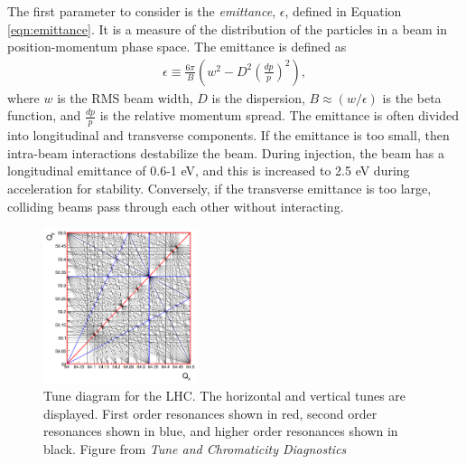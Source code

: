 The first parameter to consider is the \emph{emittance}, $\epsilon$, defined in Equation \ref{eqn:emittance}.
It is a measure of the distribution of the particles in a beam in position-momentum phase space.
The emittance is defined as
\begin{equation}\begin{split}\label{eqn:emittance}
\epsilon \equiv \frac{6\pi}{B}\left(w^2-D^2\left(\frac{dp}{p}\right)^2\right),
\end{split}\end{equation} 
where $w$ is the RMS beam width, $D$ is the dispersion, $B\approx(w/\epsilon)$ is the beta function, and $\frac{dp}{p}$ is the relative momentum spread.
The emittance is often divided into longitudinal and transverse components.
If the emittance is too small, then intra-beam interactions destabilize the beam. 
During injection, the beam has a longitudinal emittance of 0.6-1 eV, and this is increased to 2.5 eV during acceleration for stability.
Conversely, if the transverse emittance is too large, colliding beams pass through each other without interacting.
\cite{boussard}\cite{lyndon}\cite{pdgAccelSection}

\begin{figure}[h!]
\captionsetup[subfigure]{position=b}
\centering
\includegraphics[width=0.4\textwidth]{figures/experiment/tune.png}
\caption{Tune diagram for the LHC. The horizontal and vertical tunes are displayed. First order resonances shown in red, second order resonances shown in blue, and higher order resonances shown in black. Figure from \emph{Tune and Chromaticity Diagnostics} \cite{steinhagen}}
\label{fig:tune}
\end{figure}

